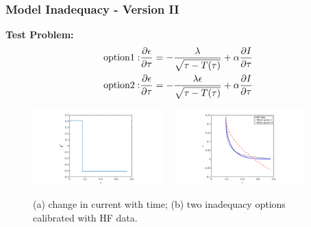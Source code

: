 \documentclass[10pt,xcolor=dvipsnames,compress]{beamer}
\begin{document}
\begin{frame}
\frametitle{Model Inadequacy - Version II}
\vfill

\textbf{Test Problem:}
\vspace{-0.2in}
\begin{eqnarray*}
{\rm option 1:} & \frac{\partial\epsilon}{\partial\tau} = -\frac{\lambda}{\sqrt{\tau - {T}(\tau)}} + \alpha \frac{\partial I}{\partial\tau}\\
{\rm option 2:} & \frac{\partial\epsilon}{\partial\tau} = -\frac{\lambda\epsilon}{\sqrt{\tau - {T}(\tau)}} + \alpha \frac{\partial I}{\partial\tau}
\end{eqnarray*}

\begin{figure}[h]
    \centering
    \includegraphics[trim = 3.8in 0.2in 4.3in 0.2in, clip, width=0.45\textwidth]{figs/I_1cycl.png} 
    ~
    \includegraphics[trim = 3.8in 0.2in 4.3in 0.2in, clip, width=0.45\textwidth]{figs/error_1cycl.png}
        \vspace{-3mm}
\caption{(a) change in current with time; (b) two inadequacy options calibrated with HF data.} 
\end{figure}


\vfill
\end{frame}
\end{document}
